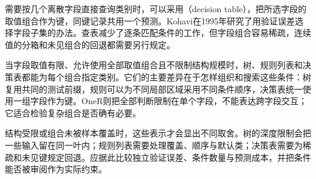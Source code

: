 需要按几个离散字段直接查询类别时，可以采用（decision table），把所选字段的取值组合作为键，同键记录共用一个预测。Kohavi在1995年研究了用验证误差选择字段子集的办法。查表减少了逐条匹配条件的工作，但字段组合容易稀疏，连续值的分箱和未见组合的回退都需要另行规定。

当字段取值有限、允许使用全部取值组合且不限制结构规模时，树、规则列表和决策表都能为每个组合指定类别。它们的主要差异在于怎样组织和搜索这些条件：树复用共同的测试前缀，规则可以为不同局部区域采用不同条件顺序，决策表统一使用一组字段作为键。OneR则把全部判断限制在单个字段，不能表达跨字段交互；它适合检验复杂组合是否确有必要。

结构受限或组合未被样本覆盖时，这些表示才会显出不同取舍。树的深度限制会把一些输入留在同一叶内；规则列表需要处理覆盖、顺序与默认类；决策表需要为稀疏和未见键规定回退。应据此比较独立验证误差、条件数量与预测成本，并把条件能否被审阅作为实际约束。
